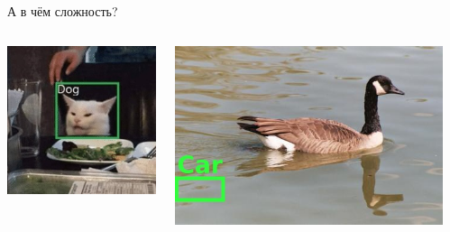 \documentclass[aspectratio=169, professionalfonts]{beamer}
\begin{document}
\begin{frame}{А в чём сложность?}
    \begin{columns}
        \begin{column}{.33\linewidth}
            \includegraphics[width=\linewidth]{graphs/fig7_1.jpg}
        \end{column}
        \begin{column}{.33\linewidth}
            \includegraphics[width=\linewidth]{graphs/fig7_2.jpg}
        \end{column}
        \begin{column}{.33\linewidth}

\end{column}
\end{columns}
\end{frame}
\end{document}
